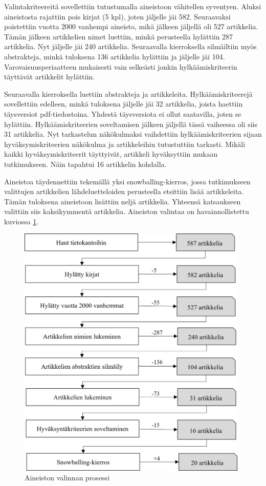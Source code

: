 \documentclass[utf8]{gradu3}
\begin{document}
Valintakriteereitä sovellettiin tutustumalla aineistoon vähitellen syventyen. Aluksi  aineistosta rajattiin pois kirjat (5 kpl), joten jäljelle jäi 582. Seuraavaksi poistettiin vuotta 2000 vanhempi aineisto, mikä jälkeen jäljellä oli 527 artikkelia. Tämän jälkeen artikkelien nimet luettiin, minkä perusteella hylättiin 287 artikkelia. Nyt jäljelle jäi 240 artikkelia. Seuraavalla kierroksella silmäiltiin myös abstrakteja, minkä tuloksena 136 artikkelia hylättiin ja jäljelle jäi 104. Varovaisuusperiaatteen mukaisesti vain selkeästi jonkin hylkäämiskriteerin täyttävät artikkelit hylättiin.

Seuraavalla kierroksella luettiin abstrakteja ja artikkeleita. Hylkäämiskriteerejä sovellettiin edelleen, minkä tuloksena jäljelle jäi 32 artikkelia, joista haettiin täysversiot pdf-tiedostoina. Yhdestä täysversiota ei ollut saatavilla, joten se hylättiin. Hylkäämiskriteerien soveltamisen jälkeen jäljellä tässä vaiheessa oli siis 31 artikkelia. Nyt tarkastelun näkökulmaksi vaihdettiin hylkäämiskriteerien sijaan hyväksymiskriteerien näkökulma ja artikkeleihin tutustuttiin tarkasti. Mikäli kaikki hyväksymiskriteerit täyttyivät, artikkeli hyväksyttiin mukaan tutkimukseen. Näin tapahtui 16 artikkelin kohdalla.

Aineistoa täydennettiin tekemällä yksi snowballing-kierros, jossa tutkimukseen valittujen artikkelien lähdeluetteloiden perusteella etsittiin lisää artikkeleita. Tämän tuloksena aineistoon lisättiin neljä artikkelia. Yhteensä katsaukseen valittiin siis kaksikymmentä artikkelia. Aineiston valintaa on havainnollistettu kuviossa \ref{kuvio:aineiston-rajaaminen-laaja}.

\begin{figure}[h]
    \centering
    \includegraphics[width=11cm]{media/aineiston-rajaaminen-laaja-vaakalinja.png}
    \caption{Aineiston valinnan prosessi}
    \label{kuvio:aineiston-rajaaminen-laaja}
\end{figure}
\end{document}
